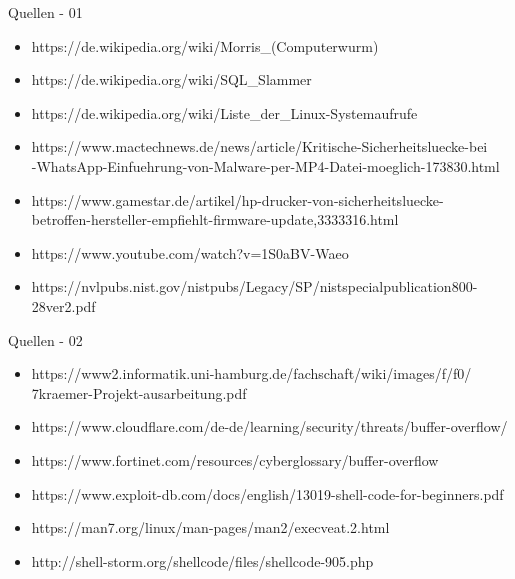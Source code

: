 \begin{frame}{Quellen - 01}
    \begin{itemize}
        \item https://de.wikipedia.org/wiki/Morris\_(Computerwurm)
        \item https://de.wikipedia.org/wiki/SQL\_Slammer
        \item https://de.wikipedia.org/wiki/Liste\_der\_Linux-Systemaufrufe
        \item https://www.mactechnews.de/news/article/Kritische-Sicherheitsluecke-bei\\-WhatsApp-Einfuehrung-von-Malware-per-MP4-Datei-moeglich-173830.html
        \item https://www.gamestar.de/artikel/hp-drucker-von-sicherheitsluecke-\\betroffen-hersteller-empfiehlt-firmware-update,3333316.html
        \item https://www.youtube.com/watch?v=1S0aBV-Waeo
        \item https://nvlpubs.nist.gov/nistpubs/Legacy/SP/nistspecialpublication800-28ver2.pdf
    \end{itemize}
\end{frame}

\begin{frame}{Quellen - 02}
    \begin{itemize}
        \item https://www2.informatik.uni-hamburg.de/fachschaft/wiki/images/f/f0/\\7kraemer-Projekt-ausarbeitung.pdf
        \item https://www.cloudflare.com/de-de/learning/security/threats/buffer-overflow/
        \item https://www.fortinet.com/resources/cyberglossary/buffer-overflow
        \item https://www.exploit-db.com/docs/english/13019-shell-code-for-beginners.pdf
        \item https://man7.org/linux/man-pages/man2/execveat.2.html
        \item http://shell-storm.org/shellcode/files/shellcode-905.php
    \end{itemize}
\end{frame}


